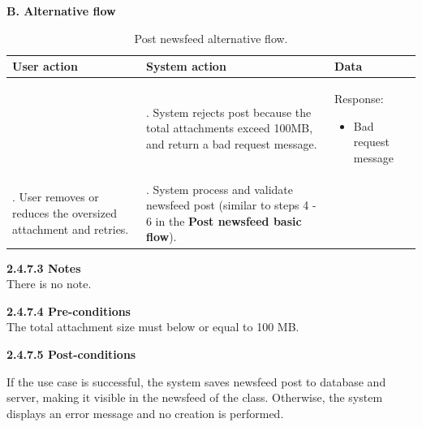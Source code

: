 \par\indent\indent\textbf{B. Alternative flow}
\vspace{-0.5em}
\renewcommand{\arraystretch}{1.5}
\begin{longtable}{|>{\raggedright\arraybackslash}p{4.5cm}|
                  >{\raggedright\arraybackslash}p{6cm}|
                  >{\raggedright\arraybackslash}p{4.5cm}|}                  
\caption{Post newsfeed alternative flow.}
\label{tab:newsfeed_management_post_newsfeed_alternative_flow}\\
\hline
\centering\textbf{User action} & \centering\textbf{System action} & \centering\arraybackslash\textbf{Data} \\
\hline
\endfirsthead
\endhead
&5. System rejects post because the total attachments exceed 100MB, and return a bad request message.&
\par{Response:
        \vspace{-0.8em}
        \begin{itemize}
            \item Bad request message
            \vspace{-1.5em}
        \end{itemize}
    }\\
\hline
6. User removes or reduces the oversized attachment and retries.& 7. System process and validate newsfeed post (similar to steps 4 - 6 in the \textbf{Post newsfeed basic flow}).&\\
\hline
\end{longtable}

\indent\textbf{2.4.7.3 Notes}\\
\indent\indent There is no note.
\vspace{0.5em}

\indent\textbf{2.4.7.4 Pre-conditions}\\
\indent\indent The total attachment size must below or equal to 100 MB.
\vspace{0.5em}

\indent\textbf{2.4.7.5 Post-conditions}\\
\vspace{-0.7em}
\par\indent\indent\parbox{0.9\textwidth}{
    If the use case is successful, the system saves newsfeed post to database and server, making it visible in the newsfeed of the class. Otherwise, the system displays an error message and no creation is performed.
}\\

